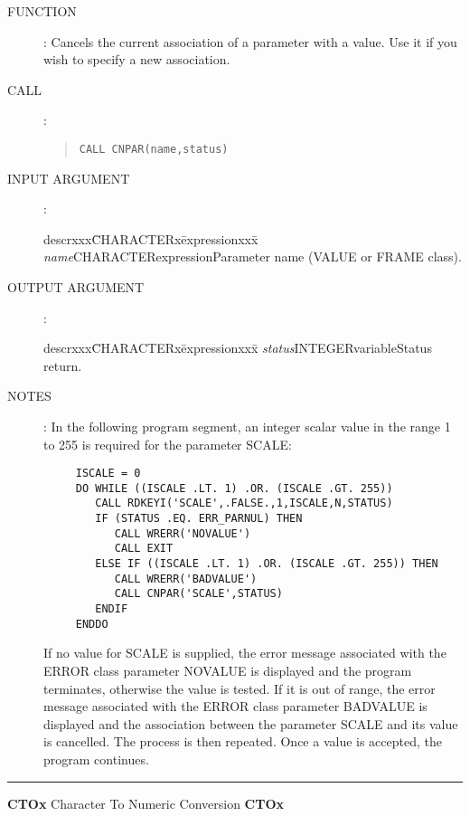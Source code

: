 \begin{description}
\item [FUNCTION]:
Cancels the current association of a parameter with a value.
Use it if you wish to specify a new association.
\item [CALL]:
\begin{quote}
{\tt CALL CNPAR(name,status)}
\end{quote}
\item [INPUT ARGUMENT]:
\begin{tabbing}
descrxxx\=CHARACTERx\=expressionxxx\=\kill
{\em name}\>CHARACTER\>expression\>Parameter name (VALUE or FRAME class).
\end{tabbing}
\item [OUTPUT ARGUMENT]:
\begin{tabbing}
descrxxx\=CHARACTERx\=expressionxxx\=\kill
{\em status}\>INTEGER\>variable\>Status return.
\end{tabbing}
\item [NOTES]:
In the following program segment, an integer scalar value in the range 1 to 255
is required for the parameter SCALE:
\begin{verbatim}
     ISCALE = 0
     DO WHILE ((ISCALE .LT. 1) .OR. (ISCALE .GT. 255))
        CALL RDKEYI('SCALE',.FALSE.,1,ISCALE,N,STATUS)
        IF (STATUS .EQ. ERR_PARNUL) THEN
           CALL WRERR('NOVALUE')
           CALL EXIT
        ELSE IF ((ISCALE .LT. 1) .OR. (ISCALE .GT. 255)) THEN
           CALL WRERR('BADVALUE')
           CALL CNPAR('SCALE',STATUS)
        ENDIF
     ENDDO
\end{verbatim}
If no value for SCALE is supplied, the error message associated with the ERROR
class parameter NOVALUE is displayed and the program terminates, otherwise the
value is tested.
If it is out of range, the error message associated with the ERROR class
parameter BADVALUE is displayed and the association between the parameter SCALE
and its value is  cancelled.
The process is then repeated.
Once a value is accepted, the program continues.
\end{description}
\rule{\textwidth}{0.3mm}
{\Large {\bf CTOx} \hfill Character To Numeric Conversion \hfill {\bf CTOx}}
